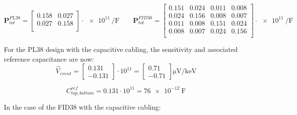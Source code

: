 \begin{equation}
\bm{P}_{tot}^{PL38}
=
\begin{bmatrix}
  0.158 & 0.027 \\
  0.027 & 0.158 \\
\end{bmatrix}
\cdot
\SI{e11}{\per\farad}
\quad \quad
\bm{P}_{tot}^{FID38} = 
\begin{bmatrix}
  0.151 & 0.024 & 0.011 & 0.008\\
  0.024 & 0.156 & 0.008 & 0.007\\
  0.011 & 0.008 & 0.151 & 0.024\\
  0.008 & 0.007 & 0.024 & 0.156\\
\end{bmatrix}
\cdot \SI{e11}{\per\farad}
\end{equation}

For the PL38 design with the capacitive cabling, the sensitivity and associated reference capacitance are now:
\begin{equation}
\vec{V}_{event}
=
\begin{bmatrix}
0.131 \\
-0.131
\end{bmatrix}
\cdot 10^{11}
=
\begin{bmatrix}
0.71 \\
-0.71
\end{bmatrix}
\si{\micro\volt\per\kilo\eV}
\end{equation}

\begin{equation}
C_{top, bottom}^{ref}
= 0.131 \cdot 10^{11}
= \SI{76e-12}{\farad}
\end{equation}

In the case of the FID38 with the capacitive cabling:

